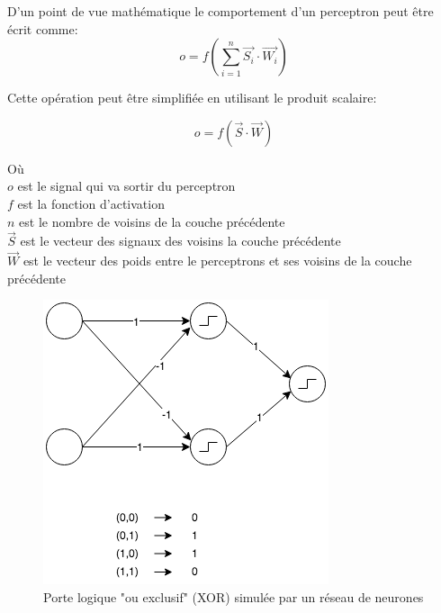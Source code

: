 \documentclass{article}
\begin{document}
D'un point de vue mathématique le comportement d'un perceptron peut être écrit comme:
\begin{equation}
o = f(\sum_{i=1}^{n} \vec{S_i} \cdot \vec{W_i})
\label{eq:percep}
\end{equation}

Cette opération peut être simplifiée en utilisant le produit scalaire:

\begin{equation}
o = f(\vec{S} \cdot \vec{W})
\end{equation}

Où\\
$o$ est le signal qui va sortir du perceptron\\
$f$ est la fonction d'activation\\
$n$ est le nombre de voisins de la couche précédente\\
$\vec{S}$ est le vecteur des signaux des voisins la couche précédente\\
$\vec{W}$ est le vecteur des poids entre le perceptrons et ses voisins de la couche précédente

\begin{figure}[H]
\begin{center}
	\includegraphics[scale=0.7]{xor.png} 
	\caption{Porte logique "ou exclusif" (XOR) simulée par un réseau de neurones}
\end{center}
\end{figure}
\end{document}
